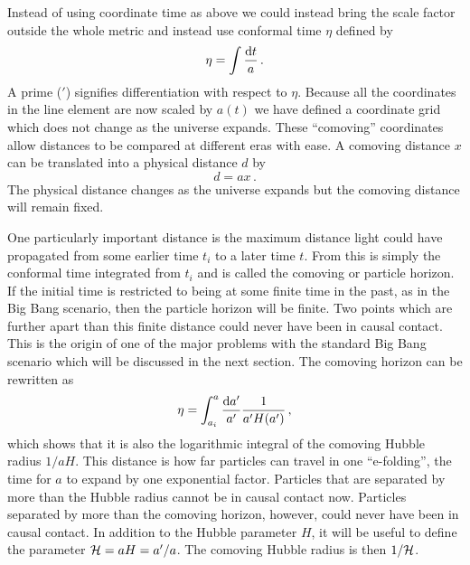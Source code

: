 Instead of using coordinate time as above we could instead bring
the scale factor outside the
whole metric and instead use conformal time $\eta$ defined by
\begin{equation}
\label{eq:etatime-intro}
 \eta = \int\frac{\mathrm{d} t}{a}\,.
\end{equation}
A prime ($'$) signifies differentiation with respect to $\eta$. 
Because all the coordinates in the line element are now scaled by $a(t)$ we
have defined a coordinate grid which does not change as the universe expands.
These ``comoving'' coordinates allow distances to be compared at different
eras with ease. A comoving distance $x$ can be translated into a physical
distance $d$ by
% 
\begin{equation}
 \label{eq:comovingdefn-intro}
 d = ax \,.
\end{equation}
The physical distance changes as the universe expands but the comoving distance
will remain fixed. 

One particularly important distance is the maximum distance light could have
propagated from some earlier time $t_i$ to a later time $t$. From
 this is simply the conformal time integrated from
$t_i$ and is called the comoving or particle horizon.
If the initial time is restricted to
being at some finite time in the past, as in the Big Bang scenario, then the
particle horizon will be finite. Two points which are further apart than
this finite distance could never have been in causal contact. This
is the origin of one of the major problems with the standard Big Bang scenario
which will be discussed in the next section.
The comoving horizon can be rewritten as
% 
\begin{equation}
 \eta = \int_{a_i}^a \frac{\mathrm{d} a'}{a'} \frac{1}{a' H(a')} \,,
\end{equation}
which shows that it is also the logarithmic integral of the comoving Hubble
radius $1/aH$. This distance is how far particles can travel in one
``e-folding'', the time for $a$ to expand by one exponential factor. Particles
that are separated by more than the Hubble radius cannot be in causal
contact now. Particles separated by more than the
comoving horizon, however, could never have been in causal contact. In addition
to the Hubble parameter $H$, it will be useful
to define the parameter $\mathcal{H} = aH = a'/a$. The comoving Hubble radius is then
$1/\mathcal{H}$.






